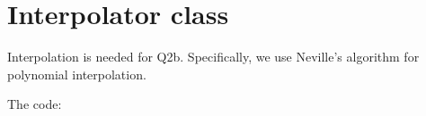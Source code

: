 \section{Interpolator class}

Interpolation is needed for Q2b. Specifically, we use Neville's algorithm for polynomial interpolation.

\noindent The code:
